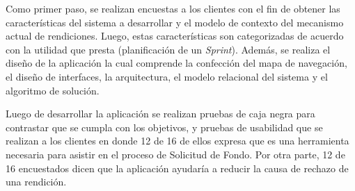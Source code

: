 \begin{resumen}

   
    Como primer paso, se realizan encuestas a los clientes con el fin de obtener las características del sistema a desarrollar y el modelo de contexto del mecanismo actual de rendiciones. Luego, estas características son categorizadas de acuerdo con la utilidad que presta (planificación de un \emph{Sprint}). Además, se realiza el diseño de la aplicación la cual comprende la confección del mapa de navegación, el diseño de interfaces, la arquitectura, el modelo relacional del sistema y el algoritmo de solución.

    

    Luego de desarrollar la aplicación se realizan pruebas de caja negra para contrastar que se cumpla con los objetivos, y pruebas de usabilidad que se realizan a los clientes en donde 12 de 16 de ellos expresa que es una herramienta necesaria para asistir en el proceso de Solicitud de Fondo. Por otra parte, 12 de 16 encuestados dicen que la aplicación ayudaría a reducir la causa de rechazo de una rendición.

    

\end{resumen}
